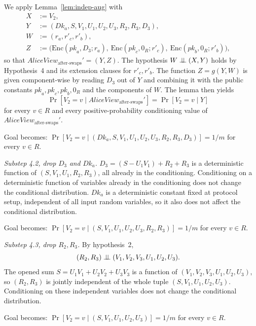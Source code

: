 \documentclass[11pt]{article}
\newcommand{\indep}{\mathrel{\perp\mkern-9mu\perp}}
\newcommand{\Encf}{\mathrm{Enc}}
\newcommand{\AliceViewHyb}{\mathit{AliceView}_{\textrm{after-swaps}}'}
\newcommand{\Dk}{\mathit{Dk}}
\newcommand{\pk}{\mathit{pk}}
\begin{document}
We apply Lemma~\ref{lem:indep-aug} with
\begin{align*}
X &:= V_2, \\
Y &:= (\Dk_a, S, V_1, U_1, U_2, U_3, R_2, R_3, D_3), \\
W &:= (r_a, r'_c, r'_b), \\
Z &:= \big(\Encf(\pk_a, D_3; r_a),\ \Encf(\pk_c, 0_R; r'_c),\ \Encf(\pk_b, 0_R; r'_b)\big),
\end{align*}
so that $\AliceViewHyb = (Y, Z)$. The hypothesis $W \indep (X, Y)$ holds by Hypothesis~4 and its extension clauses for $r'_c, r'_b$. The function $Z = g(Y, W)$ is given component-wise by reading $D_3$ out of $Y$ and combining it with the public constants $\pk_a, \pk_c, \pk_b, 0_R$ and the components of $W$. The lemma then yields
\[
\Pr[V_2 = v \mid \AliceViewHyb] = \Pr[V_2 = v \mid Y]
\]
for every $v \in R$ and every positive-probability conditioning value of $\AliceViewHyb$.

\quad Goal becomes: $\Pr[V_2 = v \mid (\Dk_a, S, V_1, U_1, U_2, U_3, R_2, R_3, D_3)] = 1/m$ for every $v \in R$.

\medskip

\textit{Substep 4.2, drop $D_3$ and $\Dk_a$.} $D_3 = (S - U_1 V_1) + R_2 + R_3$ is a deterministic function of $(S, V_1, U_1, R_2, R_3)$, all already in the conditioning. Conditioning on a deterministic function of variables already in the conditioning does not change the conditional distribution. $\Dk_a$ is a deterministic constant fixed at protocol setup, independent of all input random variables, so it also does not affect the conditional distribution.

\quad Goal becomes: $\Pr[V_2 = v \mid (S, V_1, U_1, U_2, U_3, R_2, R_3)] = 1/m$ for every $v \in R$.

\medskip

\textit{Substep 4.3, drop $R_2, R_3$.} By hypothesis~2,
\[
(R_2, R_3) \indep (V_1, V_2, V_3, U_1, U_2, U_3).
\]
The opened sum $S = U_1 V_1 + U_2 V_2 + U_3 V_3$ is a function of $(V_1, V_2, V_3, U_1, U_2, U_3)$, so $(R_2, R_3)$ is jointly independent of the whole tuple $(S, V_1, U_1, U_2, U_3)$. Conditioning on these independent variables does not change the conditional distribution.

\quad Goal becomes: $\Pr[V_2 = v \mid (S, V_1, U_1, U_2, U_3)] = 1/m$ for every $v \in R$.

\medskip
\end{document}
